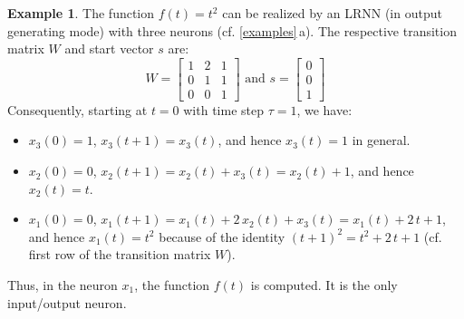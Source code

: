 \documentclass[twoside,11pt]{article}
\theoremstyle{definition}
\newtheorem{exmp}{Example}
\begin{document}
\begin{exmp}\label{parabola}
The function $f(t) = t^2$ can be realized by an LRNN (in output generating mode)
with three neurons (cf. \cref{examples}\,a). The respective transition matrix
$W$ and start vector $s$ are:
\[ W = \left[ \begin{array}{ccc}
	1 & 2 & 1\\
	0 & 1 & 1\\
	0 & 0 & 1
   \end{array} \right]
   \text{~and~} s = \left[ \begin{array}{c}
	0\\
	0\\
	1
   \end{array} \right]
\]
Consequently, starting at $t=0$ with time step $\tau=1$, we have:
\begin{itemize}
  \item $x_3(0) = 1$, $x_3(t+1) = x_3(t)$, and hence $x_3(t)=1$ in general.
  \item $x_2(0) = 0$, $x_2(t+1) = x_2(t)+x_3(t) = x_2(t)+1$, and hence $x_2(t)=t$.
  \item $x_1(0) = 0$, $x_1(t+1) = x_1(t)+ 2\,x_2(t) + x_3(t) = x_1(t)+ 2\,t +
	1$, and hence $x_1(t) = t^2$ because of the identity $(t+1)^2 = t^2 +
	2\,t + 1$ (cf. first row of the transition matrix $W$).
\end{itemize}
Thus, in the neuron $x_1$, the function $f(t)$ is computed. It is the only
input/output neuron.
\end{exmp}
\end{document}
